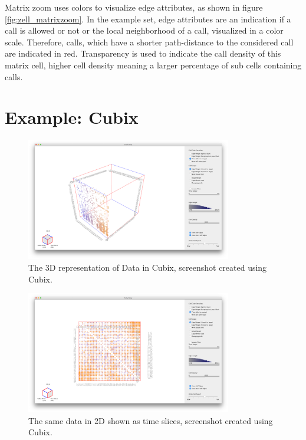 Matrix zoom uses colors to visualize edge attributes, as shown in figure \ref{fig:zell_matrixzoom}. In the example set, edge attributes are an indication if a call is allowed or not or the local neighborhood of a call, visualized in a color scale. Therefore, calls, which have a shorter path-distance to the considered call are indicated in red. Transparency is used to indicate the call density of this matrix cell, higher cell density meaning a larger percentage of sub cells containing calls. \citep[227--232]{ham-ivis-2003}


\section{Example: Cubix}

\begin{figure}[H]
\centering
\includegraphics[width=0.8\textwidth]{images/cubix3d_cell}
\caption{The 3D representation of Data in Cubix, screenshot created using Cubix.\citep[877--886]{bach-cubix-2014}\label{fig:cell_cubix3d}}
\end{figure}

\begin{figure}[H]
\centering
\includegraphics[width=0.8\textwidth]{images/cubix2d_cell}
\caption{The same data in 2D shown as time slices, screenshot created using Cubix. \citep[877--886]{bach-cubix-2014}\label{fig:cell_cubix2d}}
\end{figure}


